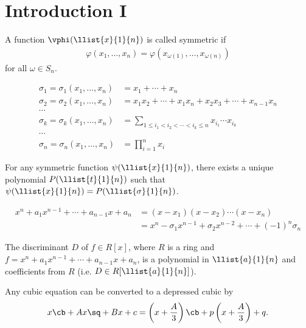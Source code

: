 \documentclass[a4paper]{article}
\begin{document}
\section{Introduction I}
\begin{tdefinition}
  A function \( \vphi(\llist{x}{1}{n}) \) is called symmetric if \begin{align*}
    \varphi(x_1,\ldots,x_n) = \varphi(x_{\omega(1)},\ldots,x_{\omega(n)})
  \end{align*}
  for all \( \omega\in S_n \).
\end{tdefinition}

\begin{tdefinition}
  \begin{align*}
    \sigma_1 = \sigma_1(x_1,\ldots,x_n) &= x_1+\cdots+x_n \\
    \sigma_2 = \sigma_2(x_1,\ldots,x_n) &= x_1x_2+\cdots+x_1x_n+x_2x_3+\cdots+x_{n-1}x_n \\
    \cdots \\
    \sigma_k = \sigma_k(x_1,\ldots,x_n)&=\sum\limits_{1\leq i_1<i_2<\cdots<i_k\leq n}x_{i_1}\cdots x_{i_k} \\
    \cdots \\
    \sigma_n = \sigma_n(x_1,\ldots,x_n)&=\prod\limits_{i=1}^n x_i
  \end{align*}
\end{tdefinition}

\begin{ttheorem}
  For any symmetric function \( \psi(\llist{x}{1}{n}) \), there exists a unique polynomial \( P(\llist{t}{1}{n}) \) such that \( \psi(\llist{x}{1}{n}) = P(\llist{\sigma}{1}{n}) \).
\end{ttheorem}

  \begin{align*}
    x^n+a_1x^{n-1}+\cdots + a_{n-1}x+a_n &= (x-x_1)(x-x_2)\cdots(x-x_n) \\
    &= x^n-\sigma_1x^{n-1} + \sigma_2 x^{n-2} + \cdots + (-1)^n\sigma_n
  \end{align*}

\begin{tcorollary}
  The discriminant \( D \) of \( f\in R[x] \), where \( R \) is a ring and \( f= x^n+a_1x^{n-1}+\cdots + a_{n-1}x+a_n\), is a polynomial in \( \llist{a}{1}{n} \) and coefficients from \( R \) (i.e. \( D \in R[\llist{a}{1}{n}] \)).
\end{tcorollary}

 \quad
Any cubic equation can be converted to a depressed cubic by \begin{align*}
  x\cb+Ax\sq+Bx+c = \left(x+\frac{A}{3}\right)\cb + p\left(x+\frac{A}{3}\right) + q.
\end{align*}
\end{document}
